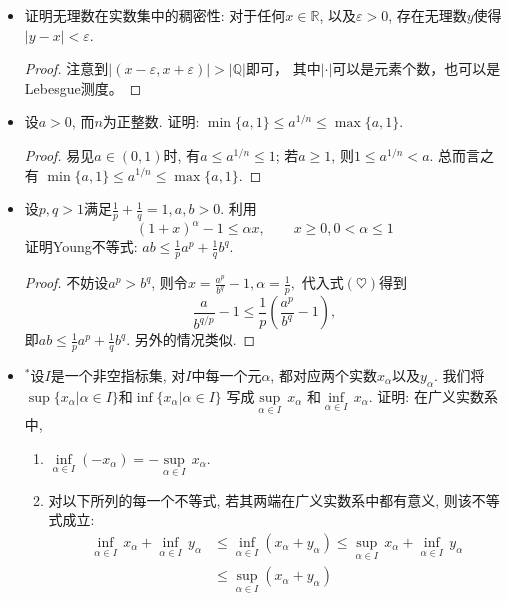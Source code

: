 \begin{4a}
\begin{itemize}
\begin{proof}[解答]
\end{proof}
\item[3.] 证明无理数在实数集中的稠密性: 对于任何\(x\in \mathbb{R}\), 以及\(\varepsilon>0\), 存在无理数\(y\)使得\(|y-x|<\varepsilon\).
\begin{proof}
注意到$|(x-\varepsilon,x+\varepsilon)|>|\mathbb{Q}|$即可，
其中$|\cdot|$可以是元素个数，也可以是Lebesgue测度。
\end{proof}
\item[4.] 设\(a>0\), 而\(n\)为正整数. 证明: \(\min \{a,1\}\leqslant a^{1/n}\leqslant\max\{a,1\}\).
\begin{proof}
易见\(a\in (0,1)\)时, 有\(a\leqslant a^{1/n}\leqslant 1\); 
若\(a\geqslant1\), 则\(1\leqslant a^{1/n}<a\). 
总而言之有 \(\min \{a,1\}\leqslant a^{1/n}\leqslant\max\{a,1\}\).
\end{proof}
\item[5.] 设\(p,q>1\)满足\(\frac{1}{p}+\frac{1}{q}=1,a,b>0\). 利用
\begin{equation*}\label{c1e1}\tag{\(\heartsuit\)}
(1+x)^\alpha-1\leqslant \alpha x,\qquad x\geqslant 0,0<\alpha\leqslant1
\end{equation*}
证明Young不等式: \(ab\leqslant\frac{1}{p}a^p+\frac{1}{q}b^q\).
\begin{proof}
不妨设\(a^p>b^q\), 则令\(x=\frac{a^p}{b^q}-1,\alpha=\frac{1}{p},\)
代入式$(\heartsuit)$得到\[\frac{a}{b^{q/p}}-1
\leqslant \frac{1}{p}\left(\frac{a^p}{b^q}-1\right),\]
即\(ab\leqslant\frac{1}{p}a^p+\frac{1}{q}b^q\). 另外的情况类似.
\end{proof}
\item[6.] ${}^*$设\(I\)是一个非空指标集, 对\(I\)中每一个元\(\alpha\), 
都对应两个实数\(x_\alpha\)以及\(y_\alpha\). 
我们将\(\sup\{x_\alpha|\alpha\in I\}\)和\(\inf\{x_\alpha|\alpha\in I\}\)
写成\(\underset{\alpha\in I}{\sup}\,x_\alpha\)
和\(\underset{\alpha\in I}{\inf}\,x_\alpha\). 证明: 在广义实数系中,
\begin{enumerate}[label=(\roman*)]
\item \(\underset{\alpha\in I}{\inf}(-x_\alpha)=-\underset{\alpha\in I}{\sup}\,x_\alpha\).
\item 对以下所列的每一个不等式, 若其两端在广义实数系中都有意义, 则该不等式成立:
\[\begin{split}
\underset{\alpha\in I}{\inf}\,x_\alpha+\underset{\alpha\in I}{\inf}\,y_\alpha
&\leqslant\underset{\alpha\in I}{\inf}(x_\alpha+y_\alpha)
\leqslant\underset{\alpha\in I}{\sup}\,x_\alpha+\underset{\alpha\in I}{\inf}\,y_\alpha\\
&\leqslant\underset{\alpha\in I}{\sup}(x_\alpha+y_\alpha)

\end{split}\]
\end{enumerate}
\end{itemize}
\end{4a}

